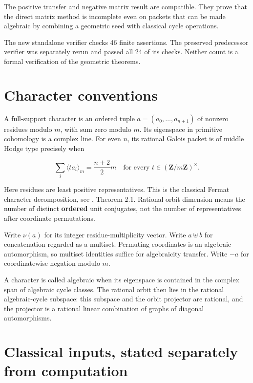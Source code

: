 The positive transfer and negative matrix result are compatible. They
prove that the direct matrix method is incomplete even on packets that
can be made algebraic by combining a geometric seed with classical cycle
operations.

The new standalone verifier checks 46 finite assertions. The preserved
predecessor verifier was separately rerun and passed all 24 of its
checks. Neither count is a formal verification of the geometric
theorems.

\hypertarget{transfer210-character-conventions}{%
\section{Character conventions}\label{transfer210-character-conventions}}

A full-support character is an ordered tuple \(a=(a_0,\ldots,a_{n+1})\)
of nonzero residues modulo \(m\), with sum zero modulo \(m\). Its
eigenspace in primitive cohomology is a complex line. For even \(n\),
its rational Galois packet is of middle Hodge type precisely when

\begin{equation}\label{eq:transfer210-2.1}
\sum_i\langle ta_i\rangle_m=\frac{n+2}{2}m
\quad\text{for every }t\in(\mathbf Z/m\mathbf Z)^\times.\end{equation}

Here residues are least positive representatives. This is the classical
Fermat character decomposition, see \cite{DaSilvaFermat}, Theorem 2.1.
Rational orbit dimension means the number of distinct \textbf{ordered}
unit conjugates, not the number of representatives after coordinate
permutations.

Write \(\nu(a)\) for its integer residue-multiplicity vector. Write
\(a\uplus b\) for concatenation regarded as a multiset. Permuting
coordinates is an algebraic automorphism, so multiset identities suffice
for algebraicity transfer. Write \(-a\) for coordinatewise negation
modulo \(m\).

A character is called algebraic when its eigenspace is contained in the
complex span of algebraic cycle classes. The rational orbit then lies in
the rational algebraic-cycle subspace: this subspace and the orbit
projector are rational, and the projector is a rational linear
combination of graphs of diagonal automorphisms.

\hypertarget{transfer210-classical-inputs-stated-separately-from-computation}{%
\section{Classical inputs, stated separately from
computation}\label{transfer210-classical-inputs-stated-separately-from-computation}}

